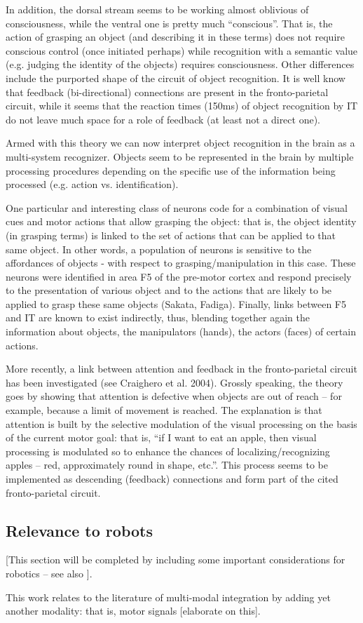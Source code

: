 In addition, the dorsal stream seems to be working almost oblivious of consciousness, while the ventral one is pretty much ``conscious''. That is, the action of grasping an object (and describing it in these terms) does not require conscious control (once initiated perhaps) while recognition with a semantic value (e.g. judging the identity of the objects) requires consciousness. Other differences include the purported shape of the circuit of object recognition. It is well know that feedback (bi-directional) connections are present in the fronto-parietal circuit, while it seems that the reaction times (150ms) of object recognition by IT do not leave much space for a role of feedback (at least not a direct one).

Armed with this theory we can now interpret object recognition in the brain as a multi-system recognizer. Objects seem to be represented in the brain by multiple processing procedures depending on the specific use of the information being processed (e.g. action vs. identification).

One particular and interesting class of neurons code for a combination of visual cues and motor actions that allow grasping the object: that is, the object identity (in grasping terms) is linked to the set of actions that can be applied to that same object. In other words, a population of neurons is sensitive to the affordances of objects - with respect to grasping/manipulation in this case. These neurons were identified in area F5 of the pre-motor cortex and respond precisely to the presentation of various object and to the actions that are likely to be applied to grasp these same objects (Sakata, Fadiga). Finally, links between F5 and IT are known to exist indirectly, thus, blending together again the information about objects, the manipulators (hands), the actors (faces) of certain actions.

More recently, a link between attention and feedback in the fronto-parietal circuit has been investigated (see Craighero et al. 2004). Grossly speaking, the theory goes by showing that attention is defective when objects are out of reach -- for example, because a limit of movement is reached. The explanation is that attention is built by the selective modulation of the visual processing on the basis of the current motor goal: that is, ``if I want to eat an apple, then visual processing is modulated so to enhance the chances of localizing/recognizing apples -- red, approximately round in shape, etc.''. This process seems to be implemented as descending (feedback) connections and form part of the cited fronto-parietal circuit.


\subsection{Relevance to robots}
[This section will be completed by including some important considerations for robotics -- see also \cite{metta03early}].

This work relates to the literature of multi-modal integration by adding yet another modality: that is, motor signals [elaborate on this]. 

